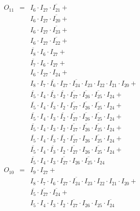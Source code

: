 \documentclass[a4paper,russian]{report}
\begin{document}
 \begin{eqnarray*}
    O_{11} & = & I_{6} \cdotp I_{27} \cdotp \overline{I_{21}} + \\
	& &  I_{6} \cdotp I_{27} \cdotp \overline{I_{20}} + \\
	& &  I_{6} \cdotp I_{27} \cdotp \overline{I_{23}} + \\
	& &  I_{6} \cdotp I_{27} \cdotp \overline{I_{22}} + \\
	& &  \overline{I_{8}} \cdotp I_{6} \cdotp I_{27} + \\
	& &  \overline{I_{7}} \cdotp I_{6} \cdotp I_{27} + \\
	& &  I_{6} \cdotp I_{27} \cdotp I_{24} + \\
	& &  I_{8} \cdotp I_{7} \cdotp \overline{I_{6}} \cdotp I_{27} \cdotp \overline{I_{24}} \cdotp I_{23} \cdotp I_{22} \cdotp I_{21} \cdotp I_{20} + \\
	& &  \overline{I_{5}} \cdotp I_{4} \cdotp \overline{I_{3}} \cdotp \overline{I_{2}} \cdotp \overline{I_{27}} \cdotp \overline{I_{26}} \cdotp \overline{I_{25}} \cdotp I_{24} + \\
	& &  \overline{I_{5}} \cdotp I_{4} \cdotp \overline{I_{3}} \cdotp I_{2} \cdotp \overline{I_{27}} \cdotp \overline{I_{26}} \cdotp \overline{I_{25}} \cdotp I_{24} + \\
	& &  \overline{I_{5}} \cdotp I_{4} \cdotp I_{3} \cdotp \overline{I_{2}} \cdotp \overline{I_{27}} \cdotp \overline{I_{26}} \cdotp \overline{I_{25}} \cdotp I_{24} + \\
	& &  \overline{I_{5}} \cdotp I_{4} \cdotp I_{3} \cdotp I_{2} \cdotp \overline{I_{27}} \cdotp \overline{I_{26}} \cdotp \overline{I_{25}} \cdotp I_{24} + \\
	& &  \overline{I_{5}} \cdotp I_{4} \cdotp \overline{I_{3}} \cdotp \overline{I_{2}} \cdotp \overline{I_{27}} \cdotp I_{26} \cdotp \overline{I_{25}} \cdotp I_{24} + \\
	& &  \overline{I_{5}} \cdotp I_{4} \cdotp \overline{I_{3}} \cdotp I_{2} \cdotp \overline{I_{27}} \cdotp I_{26} \cdotp \overline{I_{25}} \cdotp I_{24} + \\
	& &  \overline{I_{5}} \cdotp I_{4} \cdotp I_{3} \cdotp \overline{I_{27}} \cdotp I_{26} \cdotp \overline{I_{25}} \cdotp I_{24} \\
    O_{10} & = & I_{9} \cdotp I_{27} + \\
	& &  I_{8} \cdotp I_{7} \cdotp I_{6} \cdotp I_{27} \cdotp \overline{I_{24}} \cdotp I_{23} \cdotp I_{22} \cdotp I_{21} \cdotp I_{20} + \\
	& &  \overline{I_{5}} \cdotp \overline{I_{27}} \cdotp \overline{I_{24}} + \\
	& &  I_{5} \cdotp I_{4} \cdotp I_{3} \cdotp I_{2} \cdotp \overline{I_{27}} \cdotp I_{26} \cdotp I_{25} \cdotp \overline{I_{24}} \\
 \end{eqnarray*}
\pagebreak[1]
\end{document}

